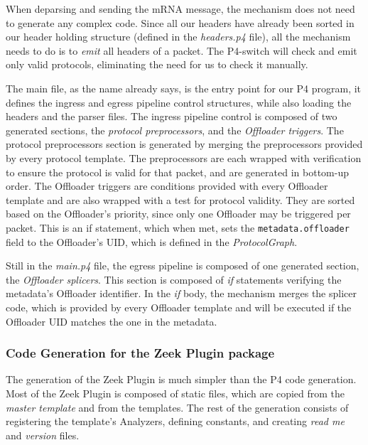 When deparsing and sending the mRNA message, the mechanism does not need to generate any complex code. Since all our headers have already been sorted in our header holding structure (defined in the \textit{headers.p4} file), all the mechanism needs to do is to \textit{emit} all headers of a packet. The P4-switch will check and emit only valid protocols, eliminating the need for us to check it manually.

The main file, as the name already says, is the entry point for our P4 program, it defines the ingress and egress pipeline control structures, while also loading the headers and the parser files. The ingress pipeline control is composed of two generated sections, the \textit{protocol preprocessors}, and the \textit{Offloader triggers}. The protocol preprocessors section is generated by merging the preprocessors provided by every protocol template. The preprocessors are each wrapped with verification to ensure the protocol is valid for that packet, and are generated in bottom-up order. The Offloader triggers are conditions provided with every Offloader template and are also wrapped with a test for protocol validity. They are sorted based on the Offloader's priority, since only one Offloader may be triggered per packet. This is an if statement, which when met, sets the \texttt{metadata.offloader} field to the Offloader's UID, which is defined in the \textit{ProtocolGraph}.

Still in the \textit{main.p4} file, the egress pipeline is composed of one generated section, the \textit{Offloader splicers}. This section is composed of \textit{if} statements verifying the metadata's Offloader identifier. In the \textit{if} body, the mechanism merges the splicer code, which is provided by every Offloader template and will be executed if the Offloader UID matches the one in the metadata.

\subsubsection*{Code Generation for the Zeek Plugin package}

The generation of the Zeek Plugin is much simpler than the P4 code generation. Most of the Zeek Plugin is composed of static files, which are copied from the \textit{master template} and from the templates. The rest of the generation consists of registering the template's Analyzers, defining constants, and creating \textit{read me} and \textit{version} files.

